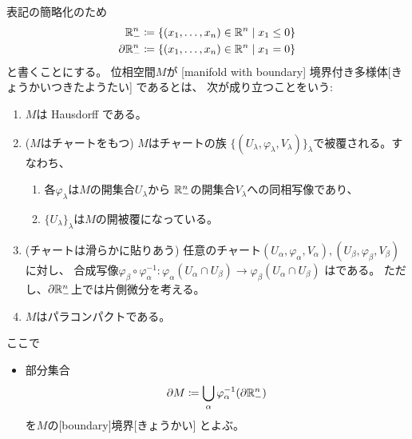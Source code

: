 \documentclass[report]{jlreq}
\begin{document}
\begin{definition}[境界付き多様体]
    表記の簡略化のため
    \begin{alignat}{1}
        \mathbb{R}_{-}^n &\coloneqq \{ (x_1, \dots, x_n) \in \mathbb{R}^n \mid x_1 \le 0 \} \\
        \partial \mathbb{R}_{-}^n &\coloneqq \{ (x_1, \dots, x_n) \in \mathbb{R}^n \mid x_1 = 0 \}
    \end{alignat}
    と書くことにする。
    位相空間$M$が
    [manifold with boundary]
    {境界付き多様体}[きょうかいつきたようたい]
    であるとは、
    次が成り立つことをいう:
    \begin{enumerate}
        \item $M$は Hausdorff である。
        \item ($M$はチャートをもつ) $M$はチャートの族
            $\{ (U_\lambda, \varphi_\lambda, V_\lambda) \}_\lambda$で被覆される。すなわち、
            \begin{enumerate}
                \item 各$\varphi_\lambda$は$M$の開集合$U_\lambda$から
                    $\mathbb{R}_{-}^n$の開集合$V_\lambda$への同相写像であり、
                \item $\{U_\lambda\}_\lambda$は$M$の開被覆になっている。
            \end{enumerate}
        \item (チャートは滑らかに貼りあう)
            任意のチャート$(U_\alpha, \varphi_\alpha, V_\alpha), (U_\beta, \varphi_\beta, V_\beta)$に対し、
            合成写像$\varphi_\beta \circ \varphi_\alpha^{-1}
                \colon \varphi_\alpha(U_\alpha \cap U_\beta)
                \to \varphi_\beta(U_\alpha \cap U_\beta)$
            は{\smooth}である。
            ただし、$\partial \mathbb{R}_{-}^n$上では片側微分を考える。
        \item $M$はパラコンパクトである。
    \end{enumerate}
    ここで
    \begin{itemize}
        \item 部分集合
            \begin{equation}
                \partial M \coloneqq \bigcup_{\alpha} \varphi_{\alpha}^{-1} (\partial \mathbb{R}_{-}^n)
            \end{equation}
            を$M$の[boundary]{境界}[きょうかい]
            とよぶ。
    \end{itemize}
\end{definition}
\end{document}
